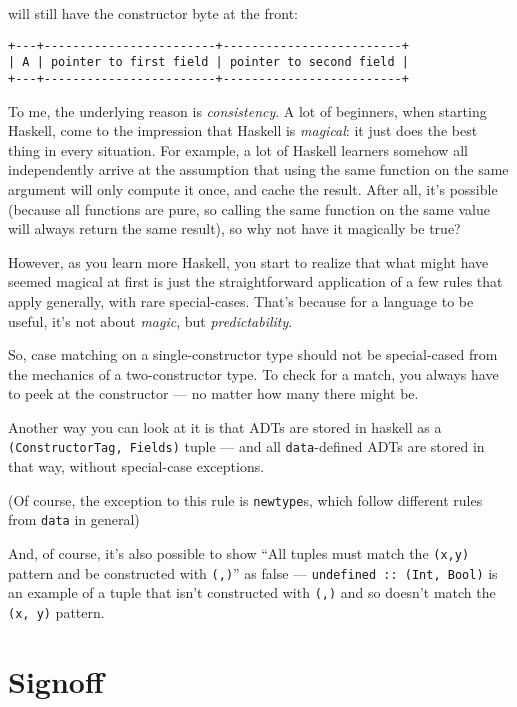 \documentclass[]{article}
\begin{document}
\begin{enumerate}
  will still have the constructor byte at the front:

\begin{verbatim}
+---+------------------------+-------------------------+
| A | pointer to first field | pointer to second field |
+---+------------------------+-------------------------+
\end{verbatim}
\end{enumerate}

To me, the underlying reason is \emph{consistency}. A lot of beginners, when
starting Haskell, come to the impression that Haskell is \emph{magical}: it just
does the best thing in every situation. For example, a lot of Haskell learners
somehow all independently arrive at the assumption that using the same function
on the same argument will only compute it once, and cache the result. After all,
it's possible (because all functions are pure, so calling the same function on
the same value will always return the same result), so why not have it magically
be true?

However, as you learn more Haskell, you start to realize that what might have
seemed magical at first is just the straightforward application of a few rules
that apply generally, with rare special-cases. That's because for a language to
be useful, it's not about \emph{magic}, but \emph{predictability}.

So, case matching on a single-constructor type should not be special-cased from
the mechanics of a two-constructor type. To check for a match, you always have
to peek at the constructor --- no matter how many there might be.

Another way you can look at it is that ADTs are stored in haskell as a
\texttt{(ConstructorTag,\ Fields)} tuple --- and all \texttt{data}-defined ADTs
are stored in that way, without special-case exceptions.

(Of course, the exception to this rule is \texttt{newtype}s, which follow
different rules from \texttt{data} in general)

And, of course, it's also possible to show ``All tuples must match the
\texttt{(x,y)} pattern and be constructed with \texttt{(,)}'' as false ---
\texttt{undefined\ ::\ (Int,\ Bool)} is an example of a tuple that isn't
constructed with \texttt{(,)} and so doesn't match the \texttt{(x,\ y)} pattern.

\section{Signoff}\label{signoff}
\end{document}
